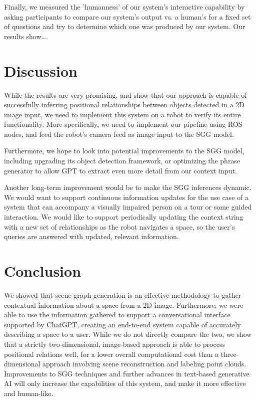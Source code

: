 \documentclass[letterpaper, 10 pt, conference]{ieeeconf}  %
\begin{document}
    Finally, we measured the 'humanness' of our system's interactive capability by asking participants to compare our system's output vs. a human's for a fixed set of questions and try to determine which one was produced by our system. Our results show\dots.

\section{Discussion}
    While the results are very promising, and show that our approach is capable of successfully inferring positional relationships between objects detected in a 2D image input, we need to implement this system on a robot to verify its entire functionality. More specifically, we need to implement our pipeline using ROS nodes, and feed the robot's camera feed as image input to the SGG model.

    Furthermore, we hope to look into potential improvements to the SGG model, including upgrading its object detection framework, or optimizing the phrase generator to allow GPT to extract even more detail from our context input.

    Another long-term improvement would be to make the SGG inferences dynamic. We would want to support continuous information updates for the use case of a system that can accompany a visually impaired person on a tour or some guided interaction. We would like to support periodically updating the context string with a new set of relationships as the robot navigates a space, so the user's queries are answered with updated, relevant information.

\section{Conclusion}
    We showed that scene graph generation is an effective methodology to gather contextual information about a space from a 2D image. Furthermore, we were able to use the information gathered to support a conversational interface supported by ChatGPT, creating an end-to-end system capable of accurately describing a space to a user. While we do not directly compare the two, we show that a strictly two-dimensional, image-based approach is able to process positional relations well, for a lower overall computational cost than a three-dimensional approach involving scene reconstruction and labeling point clouds. Improvements to SGG techniques and further advances in text-based generative AI will only increase the capabilities of this system, and make it more effective and human-like. 
\end{document}
